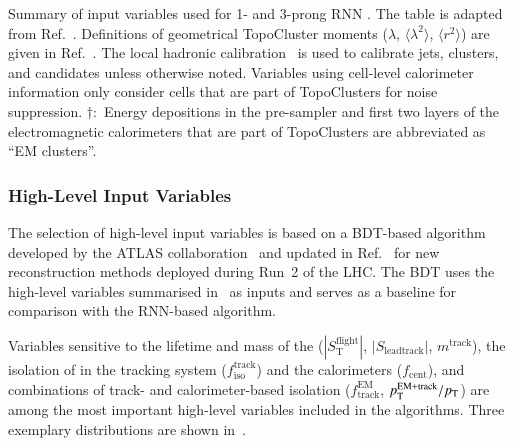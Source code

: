 \begin{table}[htbp]
  \centering

  \caption{Summary of input variables used for 1- and 3-prong RNN
    \tauid. The table is adapted from
    Ref.~\cite{ATL-PHYS-PUB-2019-033}. Definitions of geometrical
    TopoCluster moments ($\lambda$, $\langle \lambda^2 \rangle$,
    $\langle r^2 \rangle$) are given in Ref.~\cite{PERF-2014-07}. The
    local hadronic calibration~\cite{PERF-2014-07} is used to
    calibrate jets, clusters, and \tauhadvis candidates unless
    otherwise noted. Variables using cell-level calorimeter
    information only consider cells that are part of TopoClusters for
    noise suppression. $\dagger$:~Energy depositions in the
    pre-sampler and first two layers of the electromagnetic
    calorimeters that are part of TopoClusters are abbreviated as ``EM
    clusters''.}%
  \label{tab:tauid_input_variables}

  \resizebox{0.99\textwidth}{!}{
    
  }
\end{table}

\subsubsection{High-Level Input Variables}

The selection of high-level input variables is based on a BDT-based
\tauid algorithm developed by the ATLAS
collaboration~\cite{ATL-PHYS-PUB-2015-045} and updated in
Ref.~\cite{cdeutsch-master} for new \tauhadvis reconstruction methods
deployed during Run~2 of the LHC. The BDT \tauid uses the high-level
variables summarised in~ as inputs and
serves as a baseline for comparison with the RNN-based algorithm.

Variables sensitive to the lifetime and mass of the \taulepton
($|S_{\text{T}}^{\text{flight}}|$, $|S_{\text{leadtrack}}|$,
$m^{\text{track}}$), the isolation of \tauhadvis in the tracking
system ($f_{\text{iso}}^{\text{track}}$) and the calorimeters
($f_{\text{cent}}$), and combinations of track- and calorimeter-based
isolation ($f_{\text{track}}^{\text{EM}}$,
$p_{\text{T}}^{\text{EM+track}} / p_{\text{T}}$) are among the most important
high-level variables included in the \tauid algorithms. Three
exemplary distributions are shown in~.


